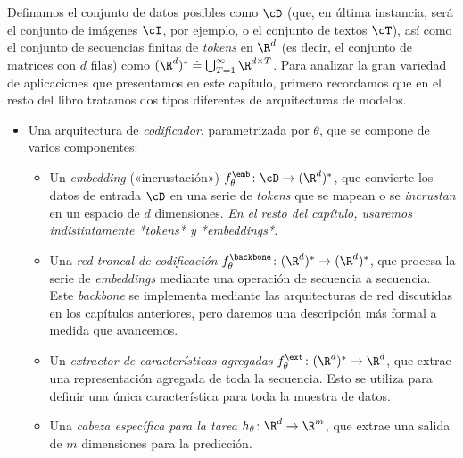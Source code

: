 \documentclass[../../book-main_es.tex]{subfiles}
\begin{document}
Definamos el conjunto de datos posibles como \(\cD\) (que, en última instancia,
    será el conjunto de imágenes \(\cI\), por ejemplo, o el conjunto de textos
\(\cT\)), así como el conjunto de secuencias finitas de \textit{tokens} en \(\R^{d}\)
(es decir, el conjunto de matrices con \(d\) filas) como \((\R^{d})^{*} \doteq
\bigcup_{T = 1}^{\infty}\R^{d \times T}\). Para analizar la
gran variedad de aplicaciones que presentamos en este capítulo, primero recordamos 
que en el resto del libro tratamos dos tipos diferentes de arquitecturas de modelos.
\begin{itemize}
    \item Una arquitectura de \textit{codificador}, parametrizada por
        \(\theta\), que se compone de varios componentes:
        \begin{itemize}
            \item Un \textit{embedding} («incrustación») \(f_{\theta}^{\emb} \colon
                \cD \to (\R^{d})^{*}\), que convierte los datos de entrada
                \(\cD\) en una serie de \textit{tokens} que se
                mapean o se \textit{incrustan} en
                un espacio de \(d\) dimensiones. \textit{En el resto del capítulo, usaremos indistintamente *tokens* y *embeddings*.}
            \item Una \textit{red troncal de codificación}
                \(f_{\theta}^{\backbone} \colon (\R^{d})^{*} \to
                (\R^{d})^{*}\), que procesa la serie de
                \textit{embeddings} mediante una operación de secuencia a secuencia.
                Este \textit{backbone} se implementa mediante las
                arquitecturas de red discutidas en los capítulos anteriores, pero
                daremos una descripción más formal a medida que avancemos.
            \item Un \textit{extractor de características agregadas}
                \(f_{\theta}^{\ext} \colon (\R^{d})^{*} \to \R^{d}\),
                que extrae una representación agregada de
                toda la secuencia. Esto se utiliza para definir una única
                característica para toda la muestra de datos. 
            \item Una \textit{cabeza específica para la tarea} \(h_{\theta} \colon
                \R^{d} \to \R^{m}\), que extrae una
                salida de \(m\) dimensiones para la predicción.

\end{itemize}
\end{itemize}
\end{document}
